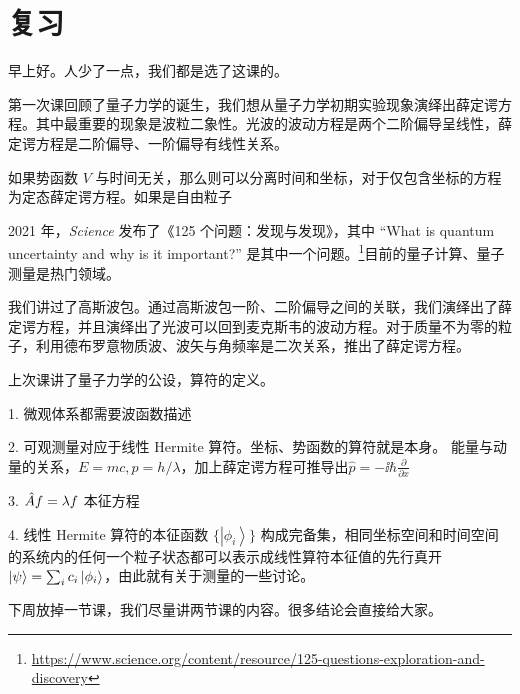 \section{复习}
早上好。人少了一点，我们都是选了这课的。

第一次课回顾了量子力学的诞生，我们想从量子力学初期实验现象演绎出薛定谔方程。其中最重要的现象是波粒二象性。光波的波动方程是两个二阶偏导呈线性，薛定谔方程是二阶偏导、一阶偏导有线性关系。

如果势函数 $V$ 与时间无关，那么则可以分离时间和坐标，对于仅包含坐标的方程为定态薛定谔方程。如果是自由粒子

2021 年，\emph{Science} 发布了《125 个问题：发现与发现》，其中 ``What is quantum uncertainty and why is it important?'' 是其中一个问题。\footnote{\url{https://www.science.org/content/resource/125-questions-exploration-and-discovery}}目前的量子计算、量子测量是热门领域。

我们讲过了高斯波包。通过高斯波包一阶、二阶偏导之间的关联，我们演绎出了薛定谔方程，并且演绎出了光波可以回到麦克斯韦的波动方程。对于质量不为零的粒子，利用德布罗意物质波、波矢与角频率是二次关系，推出了薛定谔方程。

上次课讲了量子力学的公设，算符的定义。

1. 微观体系都需要波函数描述

2. 可观测量对应于线性 Hermite 算符。坐标、势函数的算符就是本身。 能量与动量的关系，$E = mc, p = h/\lambda$，加上薛定谔方程可推导出$\hat p = -\ii \hbar \frac{\partial}{\partial x}$

3. $\AA f = \lambda f$ 本征方程

4. 线性 Hermite 算符的本征函数 $\{\left|\phi_i\right\rangle\}$ 构成完备集，相同坐标空间和时间空间的系统内的任何一个粒子状态都可以表示成线性算符本征值的先行真开 $\ket{\psi} = \sum_i c_i \ket{\phi_i}$，由此就有关于测量的一些讨论。

下周放掉一节课，我们尽量讲两节课的内容。很多结论会直接给大家。

